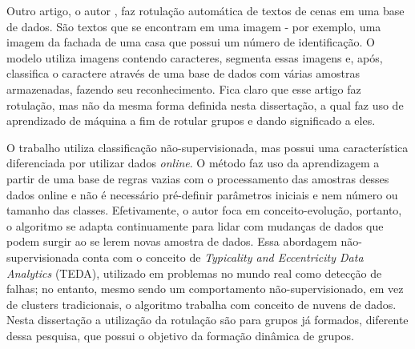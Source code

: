 Outro artigo, o autor \cite{Iwamura2013}, faz rotulação automática de textos de cenas em uma base de dados. São textos que se encontram em uma imagem - por exemplo, uma imagem da fachada de uma casa que possui um número de identificação. O modelo utiliza imagens contendo caracteres, segmenta essas imagens e, após, classifica o caractere através de uma base de dados com várias amostras armazenadas, fazendo seu reconhecimento. Fica claro que esse artigo faz rotulação, mas não da mesma forma definida nesta dissertação, a qual faz uso de aprendizado de máquina a fim de rotular grupos e dando significado a eles. 


O trabalho \cite{Costa2016} utiliza classificação não-supervisionada, mas possui uma característica diferenciada por utilizar dados \textit{online}. O método faz uso da aprendizagem a partir de uma base de regras vazias com o processamento das amostras desses dados online e não é necessário pré-definir parâmetros iniciais e nem número ou tamanho das classes. Efetivamente, o autor foca em conceito-evolução, portanto, o algoritmo se adapta continuamente para lidar com mudanças de dados que podem surgir ao se lerem novas amostra de dados. Essa abordagem não-supervisionada conta com o conceito de \textit{Typicality and Eccentricity Data Analytics} (TEDA), utilizado em problemas no mundo real como detecção de falhas; no entanto, mesmo sendo um comportamento não-supervisionado, em vez de clusters tradicionais, o algoritmo trabalha com conceito de nuvens de dados. Nesta dissertação a utilização da rotulação são para grupos já formados, diferente dessa pesquisa, que possui o objetivo da formação dinâmica de grupos.



